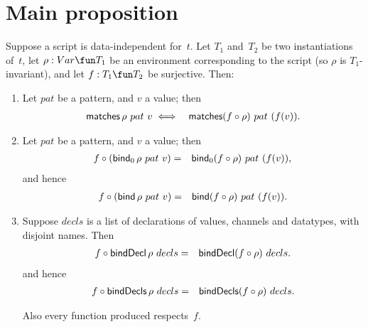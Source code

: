 


\section{Main proposition}

\begin{prop}
\label{prop:expressions-1}
Suppose a script is data-independent for~$t$.  Let $T_1$ and~$T_2$ be two
instantiations of~$t$, let $\rho: Var \fun T_1$ be an environment
corresponding to the script (so $\rho$ is $T_1$-invariant), and let $f : T_1
\fun T_2$ be surjective.  Then:
\begin{enumerate}
\item\label{item:matches} Let $pat$ be a pattern, and $v$ a value; then
\begin{eqnarray*}
  \mathop{\sf matches} \rho~ pat~v & \iff & \mathop{\sf matches} (f\circ\rho) ~ pat~(f(v)).
\end{eqnarray*}

\item\label{item:bind}
Let $pat$ be a pattern, and $v$ a value; then
\begin{eqnarray*}
f \circ (\mathop{\sf bind}\nolimits_0 \rho~pat~v) &  = & \mathop{\sf bind}\nolimits_0 (f\circ\rho)~pat~(f(v)),
\end{eqnarray*}
and hence
\begin{eqnarray*}
f \circ (\mathop{\sf bind}\nolimits \rho~pat~v) & = & \mathop{\sf bind}\nolimits (f\circ\rho)~pat~(f(v)).
\end{eqnarray*}

\item\label{item:bindDecls} Suppose $decls$ is a list of declarations of
  values, channels and datatypes, with disjoint names.  Then
  \begin{eqnarray*}
  f \circ \mathop{\sf bindDecl} \rho~decls & = & \mathop{\sf bindDecl} (f \circ \rho)~decls.
  \end{eqnarray*}
  and hence
  \begin{eqnarray*}
  f \circ \mathop{\sf bindDecls} \rho~decls & = & \mathop{\sf bindDecls} (f \circ \rho)~decls.
  \end{eqnarray*}

Also every function produced respects~$f$. 


%


\end{enumerate}
\end{prop}
